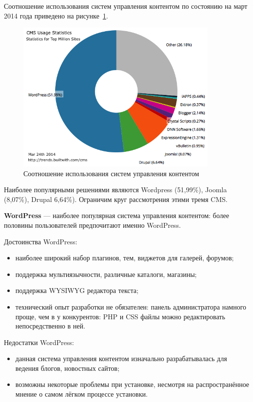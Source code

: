 Соотношение использования систем управления контентом по состоянию на март 2014 года приведено
на рисунке~\ref{fig:cms_usage_stat}.

\begin{figure}[h]
  \centering
  \includegraphics[width=100mm]{pic/cms_usage_statistics.png}
  \caption{Соотношение использования систем управления контентом}
  \label{fig:cms_usage_stat}
\end{figure}

Наиболее популярными решениями являются Wordpress (51{,}99\%), Joomla (8{,}07\%), Drupal 6{,}64\%).
Ограничим круг рассмотрения этими тремя CMS.

\textbf{WordPress} --- наиболее популярная система управления контентом:
более половины пользователей предпочитают именно WordPress.

Достоинства WordPress:
\begin{itemize}
\item
  наиболее широкий набор плагинов, тем, виджетов для галерей, форумов;
\item
  поддержка мультиязычности, различные каталоги, магазины;
\item
  поддержка WYSIWYG редактора текста;
\item
  технический опыт разработки не обязателен: панель администратора намного проще, чем в у конкурентов:
  PHP и CSS файлы можно редактировать непосредственно в ней.
\end{itemize}

Недостатки WordPress:
\begin{itemize}
\item
  данная система управления контентом изначально разрабатывалась для ведения блогов, новостных сайтов; 

\item
  возможны некоторые проблемы при установке,
  несмотря на распространённое мнение о самом лёгком процессе установки.
\end{itemize}

